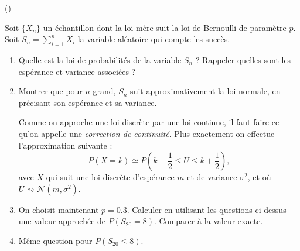 \begin{exercice}\label{exoInf1} (\minsyndical)

Soit $\{ X_n \}$ un \'echantillon dont la loi m\`ere suit la loi de Bernoulli de param\`etre $p$. Soit $S_n = \sum_{i=1}^n X_i$ la variable al\'eatoire qui compte les succ\`es.

\begin{enumerate}

\item Quelle est la loi de probabilit\'es de la variable $S_n$ ? Rappeler quelles sont les esp\'erance et variance associ\'ees ?

\item Montrer que pour $n$ grand, $S_n$ suit approximativement la loi normale, en pr\'ecisant son esp\'erance et sa variance.

Comme on approche une loi discr\`ete par une loi continue, il faut faire ce qu'on appelle une {\it correction de continuit\'e}. Plus exactement on effectue l'approximation suivante :
\[
P(X = k) \simeq P (k - \frac12 \leq U \leq k + \frac12),
\]
avec $X$ qui suit une loi discr\`ete d'esp\'erance $m$ et de variance $\sigma^2$, et
o\`u $U \rightsquigarrow \mathcal{N} (m, \sigma^2)$.

\item On choisit maintenant $p=0.3$. Calculer en utilisant les questions ci-dessus une valeur approch\'ee de $P(S_{20} = 8)$. Comparer \`a la valeur exacte.

\item M\^eme question pour $P(S_{20} \leq 8)$.

\end{enumerate}


\end{exercice}
